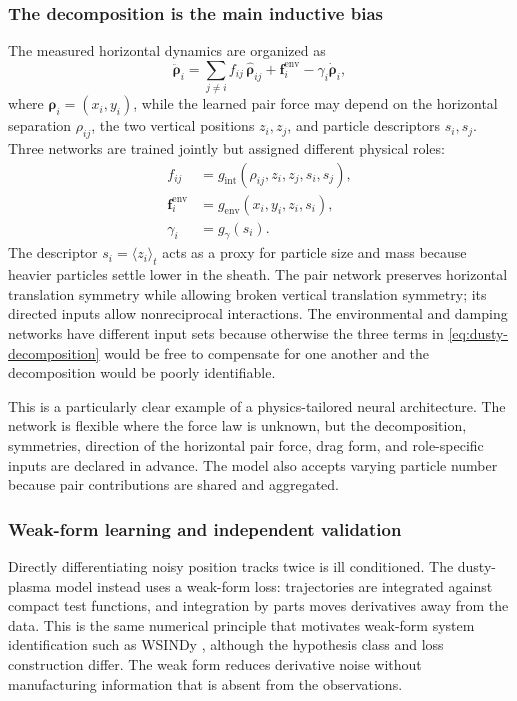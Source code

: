 \subsubsection{The decomposition is the main inductive bias}

The measured horizontal dynamics are organized as
\begin{equation}
\ddot{\bm\rho}_i
=
\sum_{j\ne i}
f_{ij}\,\widehat{\bm\rho}_{ij}
+\bm f_i^{\mathrm{env}}
-\gamma_i\dot{\bm\rho}_i,
\label{eq:dusty-decomposition}
\end{equation}
where \(\bm\rho_i=(x_i,y_i)\), while the learned pair force may depend on the horizontal separation \(\rho_{ij}\), the two vertical positions \(z_i,z_j\), and particle descriptors \(s_i,s_j\). Three networks are trained jointly but assigned different physical roles:
\begin{align}
f_{ij}
&=
g_{\mathrm{int}}(\rho_{ij},z_i,z_j,s_i,s_j),\\
\bm f_i^{\mathrm{env}}
&=
g_{\mathrm{env}}(x_i,y_i,z_i,s_i),\\
\gamma_i
&=
g_{\gamma}(s_i).
\end{align}
The descriptor \(s_i=\langle z_i\rangle_t\) acts as a proxy for particle size and mass because heavier particles settle lower in the sheath. The pair network preserves horizontal translation symmetry while allowing broken vertical translation symmetry; its directed inputs allow nonreciprocal interactions. The environmental and damping networks have different input sets because otherwise the three terms in \cref{eq:dusty-decomposition} would be free to compensate for one another and the decomposition would be poorly identifiable.

This is a particularly clear example of a physics-tailored neural architecture. The network is flexible where the force law is unknown, but the decomposition, symmetries, direction of the horizontal pair force, drag form, and role-specific inputs are declared in advance. The model also accepts varying particle number because pair contributions are shared and aggregated.

\subsubsection{Weak-form learning and independent validation}

Directly differentiating noisy position tracks twice is ill conditioned. The dusty-plasma model instead uses a weak-form loss: trajectories are integrated against compact test functions, and integration by parts moves derivatives away from the data. This is the same numerical principle that motivates weak-form system identification such as WSINDy \citep{messenger2021wsindy}, although the hypothesis class and loss construction differ. The weak form reduces derivative noise without manufacturing information that is absent from the observations.

